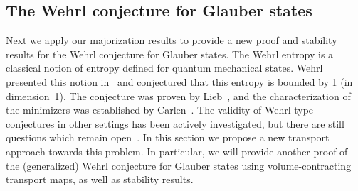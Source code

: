 \documentclass[10pt]{amsart}
\theoremstyle{definition}\newtheorem{defi}[theo]{Definition}\newtheorem{rema}[theo]{Remark}\newtheorem{exam}[theo]{Example}\newtheorem{exem}[theo]{Example}\newtheorem{nota}[theo]{Notation}
\begin{document}
\subsection{The Wehrl conjecture for Glauber states}\label{subsec:Wehrl_intro}
Next we apply our majorization results to provide a new proof and stability results for the Wehrl conjecture for Glauber states. The Wehrl entropy is a classical notion of entropy defined for quantum mechanical states. Wehrl presented this notion in~\cite{wehrl1979relation} and conjectured that this entropy is bounded by 1 (in dimension~1). The conjecture was proven by Lieb~\cite{MR0506364}, and the characterization of the minimizers was established by Carlen~\cite{MR1105661}. The validity of Wehrl-type conjectures in other settings has been actively investigated, but there are still questions which remain open~\cite{MR4580699,kulikov2022monotonicity}. In this section we propose a new transport approach towards this problem. In particular, we will provide another proof of the (generalized) Wehrl conjecture for Glauber states using volume-contracting transport maps, as well as stability results.
\end{document}
